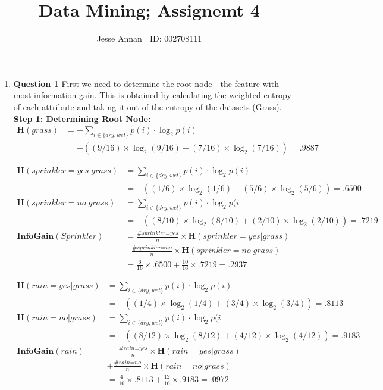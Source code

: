 \documentclass[10pt,a4paper]{article}
\title{Data Mining; Assignemt 4}
\author{Jesse Annan \hspace{0.5cm} | \hspace{0.5cm} ID: 002708111}
\newcommand{\h}{\textbf{H}}
\newcommand{\ig}{\textbf{InfoGain}}
\newcommand{\sdw}{\displaystyle{ \sum_{i \in \{dry, wet\}} }}
\begin{document}
	\maketitle

    \clearpage
 
	\begin{enumerate}
		\item \textbf{Question 1} \newline
		First we need to determine the root node - the feature with most information gain. \newline
		This is obtained by calculating the weighted entropy of each attribute and taking it out of the entropy of the datasets (Grass). \newline
			\textbf{Step 1: Determining Root Node:} \newline
				\begin{equation*}
						\begin{split}
							\h(grass) & = - \sdw p(i) \cdot \log_2 p(i) \\
							& = - ( (9/16)\times\log_2(9/16) + (7/16)\times\log_2(7/16) ) = .9887
						\end{split}
				\end{equation*}
			
				\begin{equation*}
					\begin{split}
						\h(sprinkler=yes | grass) & = \sdw p(i) \cdot \log_2 p(i) \\
						& = -( (1/6)\times\log_2(1/6) + (5/6)\times\log_2(5/6) ) = .6500 \\
						\h(sprinkler=no | grass) & = \sdw p(i) \cdot \log_2 p(i \\
						& = -( (8/10)\times\log_2(8/10) + (2/10)\times\log_2(2/10) ) = .7219 \\
						\ig(Sprinkler) & = \frac{\# \textit{sprinkler=yes}}{n} \times \h(sprinkler=yes | grass) \\
						& + \frac{\# \textit{sprinkler=no}}{n} \times \h(sprinkler=no | grass) \\
						& = \frac{6}{16} \times .6500 + \frac{10}{16} \times .7219 = .2937
					\end{split}
				\end{equation*}
			
				\begin{equation*}
					\begin{split}
						\h(rain=yes | grass) & = \sdw p(i) \cdot \log_2 p(i) \\
						& = -( (1/4)\times\log_2(1/4) + (3/4)\times\log_2(3/4) ) = .8113 \\
						\h(rain=no | grass) & = \sdw p(i) \cdot \log_2 p(i \\
						& = -( (8/12)\times\log_2(8/12) + (4/12)\times\log_2(4/12) ) = .9183 \\
						\ig(rain) & = \frac{\# \textit{rain=yes}}{n} \times \h(rain=yes | grass) \\
						& + \frac{\# \textit{rain=no}}{n} \times \h(rain=no | grass) \\
						& = \frac{4}{16} \times .8113 + \frac{12}{16} \times .9183 = .0972
					\end{split}
				\end{equation*}
		

\end{enumerate}
\end{document}
